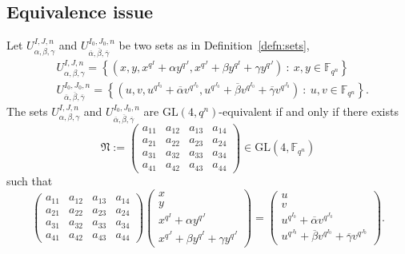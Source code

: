 \subsection{Equivalence issue}\label{sec:equivalence}

Let $U_{\alpha, \beta, \gamma}^{I,J,n}$ and $U_{\overline{\alpha}, \overline{\beta}, \overline{\gamma}}^{I_0,J_0,n}$ be two sets as in Definition~\ref{defn:sets},
\begin{equation}
\label{eq:sets:gammaell}
    \begin{split}
        &U_{\alpha, \beta, \gamma}^{I,J,n} =\left\{\left(x,y,x^{q^I}+\alpha y^{q^J},x^{q^J}+\beta y^{q^I} + \gamma y^{q^J}\right) \ : \ x,y\in \mathbb{F}_{q^n}\right\}\\
        &U_{\overline{\alpha}, \overline{\beta}, \overline{\gamma}}^{I_0,J_0,n}=\left\{\left(u,v,u^{q^{I_0}}+\overline{\alpha} v^{q^{J_0}},u^{q^{J_0}}+\overline{\beta} v^{q^{I_0}} + \overline{\gamma} v^{q^{J_0}}\right) \ : \ u,v\in \mathbb{F}_{q^n}\right\}.
    \end{split}
\end{equation}
The sets $U_{\alpha, \beta, \gamma}^{I,J,n}$ and $U_{\overline{\alpha}, \overline{\beta}, \overline{\gamma}}^{I_0,J_0,n}$ are $\textrm{GL}(4,q^n)$-equivalent if and only if there exists 
\begin{equation}
\label{eq:mat:gammaell}
\mathfrak{N}:=\begin{pmatrix}
a_{11}&a_{12}&a_{13}&a_{14}\\
a_{21}&a_{22}&a_{23}&a_{24}\\
a_{31}&a_{32}&a_{33}&a_{34}\\
a_{41}&a_{42}&a_{43}&a_{44}
\end{pmatrix}\in \mathrm{GL}(4,\mathbb{F}_{q^n})
\end{equation}
such that 
\begin{equation*}
\begin{pmatrix}
a_{11}&a_{12}&a_{13}&a_{14}\\
a_{21}&a_{22}&a_{23}&a_{24}\\
a_{31}&a_{32}&a_{33}&a_{34}\\
a_{41}&a_{42}&a_{43}&a_{44}
\end{pmatrix}
\begin{pmatrix}
x\\
y\\
x^{q^I}+\alpha y^{q^J}\\
x^{q^J}+\beta y^{q^I} + \gamma y^{q^J}
\end{pmatrix}=
\begin{pmatrix}
u\\
v\\
u^{q^{I_0}}+\overline{\alpha} v^{q^{J_0}}\\
u^{q^{J_0}}+\overline{\beta} v^{q^{I_0}} + \overline{\gamma} v^{q^{J_0}}
\end{pmatrix}.
\end{equation*}

